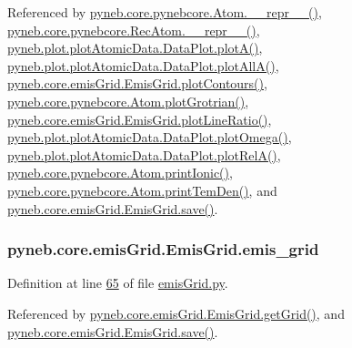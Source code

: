 Referenced by \hyperlink{pynebcore_8py_source_l02544}{pyneb.\+core.\+pynebcore.\+Atom.\+\_\+\+\_\+repr\+\_\+\+\_\+()}, \hyperlink{pynebcore_8py_source_l03032}{pyneb.\+core.\+pynebcore.\+Rec\+Atom.\+\_\+\+\_\+repr\+\_\+\+\_\+()}, \hyperlink{plot_atomic_data_8py_source_l00116}{pyneb.\+plot.\+plot\+Atomic\+Data.\+Data\+Plot.\+plot\+A()}, \hyperlink{plot_atomic_data_8py_source_l00188}{pyneb.\+plot.\+plot\+Atomic\+Data.\+Data\+Plot.\+plot\+All\+A()}, \hyperlink{emis_grid_8py_source_l00179}{pyneb.\+core.\+emis\+Grid.\+Emis\+Grid.\+plot\+Contours()}, \hyperlink{pynebcore_8py_source_l02372}{pyneb.\+core.\+pynebcore.\+Atom.\+plot\+Grotrian()}, \hyperlink{emis_grid_8py_source_l00238}{pyneb.\+core.\+emis\+Grid.\+Emis\+Grid.\+plot\+Line\+Ratio()}, \hyperlink{plot_atomic_data_8py_source_l00372}{pyneb.\+plot.\+plot\+Atomic\+Data.\+Data\+Plot.\+plot\+Omega()}, \hyperlink{plot_atomic_data_8py_source_l00261}{pyneb.\+plot.\+plot\+Atomic\+Data.\+Data\+Plot.\+plot\+Rel\+A()}, \hyperlink{pynebcore_8py_source_l02167}{pyneb.\+core.\+pynebcore.\+Atom.\+print\+Ionic()}, \hyperlink{pynebcore_8py_source_l02253}{pyneb.\+core.\+pynebcore.\+Atom.\+print\+Tem\+Den()}, and \hyperlink{emis_grid_8py_source_l00096}{pyneb.\+core.\+emis\+Grid.\+Emis\+Grid.\+save()}.

\hypertarget{classpyneb_1_1core_1_1emis_grid_1_1_emis_grid_a6fd6b209384aaa2cd4ba5051477e4ecb}{}
\subsubsection[{emis\+\_\+grid}]{\setlength{\rightskip}{0pt plus 5cm}pyneb.\+core.\+emis\+Grid.\+Emis\+Grid.\+emis\+\_\+grid}\label{classpyneb_1_1core_1_1emis_grid_1_1_emis_grid_a6fd6b209384aaa2cd4ba5051477e4ecb}


Definition at line \hyperlink{emis_grid_8py_source_l00065}{65} of file \hyperlink{emis_grid_8py_source}{emis\+Grid.\+py}.



Referenced by \hyperlink{emis_grid_8py_source_l00111}{pyneb.\+core.\+emis\+Grid.\+Emis\+Grid.\+get\+Grid()}, and \hyperlink{emis_grid_8py_source_l00096}{pyneb.\+core.\+emis\+Grid.\+Emis\+Grid.\+save()}.

\hypertarget{classpyneb_1_1core_1_1emis_grid_1_1_emis_grid_a1a53003d1e4a12bbc4ff9233a3fcd54a}{}
